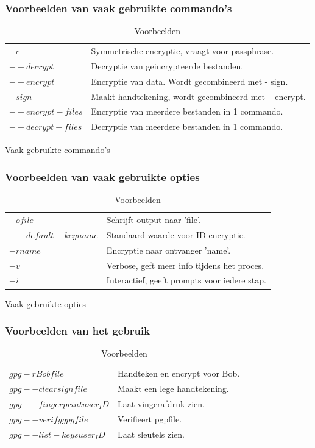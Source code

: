 \documentclass[12pt]{article}
\begin{document}
				\subsubsection{Voorbeelden van vaak gebruikte commando's}\label{com}
					\begin{table}[!ht]
						\begin{tabular}{l|l}
								$-c$				&	Symmetrische encryptie, vraagt voor 																	passphrase.\\
								$--decrypt$			&	Decryptie van geincrypteerde bestanden.\\
								$--encrypt$			&	Encryptie van data. Wordt gecombineerd met -															sign.\\
								$-sign$				&	Maakt handtekening, wordt gecombineerd met --															encrypt.\\
								$--encrypt-files$	&	Encryptie van meerdere bestanden in 1 																	commando.\\
								$--decrypt-files$	&	Decryptie van meerdere bestanden in 1 																	commando.\\
						\end{tabular}
						\caption{Vaak gebruikte commando's}						
					
				\subsubsection{Voorbeelden van vaak gebruikte opties}\label{opt}					
						\begin{tabular}{l|l}
								$-o file$				&	Schrijft output naar 'file'.\\
								$--default-key name$	&	Standaard waarde voor ID encryptie.\\
								$-r name$				&	Encryptie naar ontvanger 'name'.\\
								$-v$					&	Verbose, geft meer info tijdens het 																	proces.\\
								$-i$					&	Interactief, geeft prompts voor iedere 																	stap.\\
						\end{tabular}\caption{Vaak gebruikte opties}
											
				\subsubsection{Voorbeelden van het gebruik}\label{use}
						\begin{tabular}{l|l}
								$gpg -r Bob file$				&	Handteken en encrypt voor Bob.\\
								$gpg --clearsign file$			&	Maakt een lege handtekening.\\
								$gpg --fingerprint user_ID$		&	Laat vingerafdruk zien.\\
								$gpg --verify gpgfile$			&	Verifieert pgpfile.\\
								$gpg --list-keys user_ID$		&	Laat sleutels zien.\\
						\end{tabular}
						\caption{Voorbeelden}
					\end{table}	
			
\end{document}
